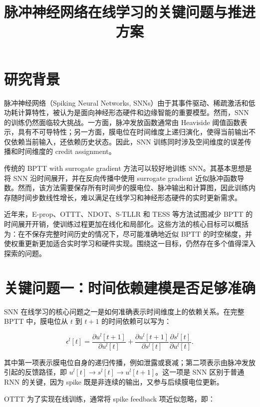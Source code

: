 \documentclass[11pt]{ctexart}
\title{脉冲神经网络在线学习的关键问题与推进方案}
\author{}
\date{}
\begin{document}
\maketitle

\section{研究背景}

脉冲神经网络（Spiking Neural Networks, SNNs）由于其事件驱动、稀疏激活和低功耗计算特性，被认为是面向神经形态硬件和边缘智能的重要模型。然而，SNN 的训练仍然面临较大挑战。一方面，脉冲发放函数通常由 Heaviside 阈值函数表示，具有不可导特性；另一方面，膜电位在时间维度上递归演化，使得当前输出不仅依赖当前输入，还依赖历史状态。因此，SNN 训练同时涉及空间维度的误差传播和时间维度的 credit assignment。

传统的 BPTT with surrogate gradient 方法可以较好地训练 SNN。其基本思想是将 SNN 沿时间展开，并在反向传播中使用 surrogate gradient 近似脉冲函数导数。然而，该方法需要保存所有时间步的膜电位、脉冲输出和计算图，因此训练内存随时间步数线性增长，难以满足在线学习和神经形态硬件的实时更新需求。

近年来，E-prop、OTTT、NDOT、S-TLLR 和 TESS 等方法试图减少 BPTT 的时间展开开销，使训练过程更加在线化和局部化。这些方法的核心目标可以概括为：在不保存完整时间历史的情况下，尽可能准确地近似 BPTT 的时空梯度，并使权重更新更加适合实时学习和硬件实现。围绕这一目标，仍然存在多个值得深入探索的问题。

\section{关键问题一：时间依赖建模是否足够准确}

SNN 在线学习的核心问题之一是如何准确表示时间维度上的依赖关系。在完整 BPTT 中，膜电位从 $t$ 到 $t+1$ 的时间依赖可以写为：

\begin{equation}
\epsilon^l[t]
=
\frac{\partial u^l[t+1]}{\partial u^l[t]}
+
\frac{\partial u^l[t+1]}{\partial s^l[t]}
\frac{\partial s^l[t]}{\partial u^l[t]} .
\end{equation}

其中第一项表示膜电位自身的递归传播，例如泄露或衰减；第二项表示由脉冲发放引起的反馈路径，即 $u^l[t] \rightarrow s^l[t] \rightarrow u^l[t+1]$。这一项是 SNN 区别于普通 RNN 的关键，因为 spike 既是非连续的输出，又参与后续膜电位更新。

OTTT 为了实现在线训练，通常将 spike feedback 项近似忽略，即：
\end{document}
